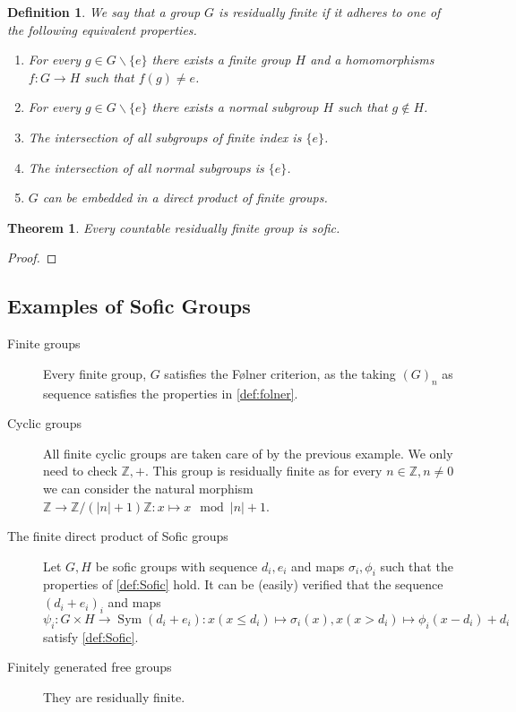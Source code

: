 \documentclass[titlepage, a4paper]{article}
\newcommand{\Z}{\mathbb{Z}}
\DeclareMathOperator{\sym}{Sym}
\newtheorem{theorem}{Theorem}
\newtheorem{definition}{Definition}
\theoremstyle{remark}
\begin{document}
\begin{definition}\cite{noauthor_residually_2018} \label{def:res_fin}
       We say that a group $G$ is residually finite if it adheres to one of the following equivalent properties.
        \begin{enumerate}
            \item For every $g \in G\backslash\{e\}$ there exists a finite group $H$ and a homomorphisms $f:G \to H$ such that $f(g) \ne e$.
            \item For every $g \in G\backslash\{e\}$ there exists a normal subgroup $H$ such that $g \notin H$.
            \item The intersection of all subgroups of finite index is $\{e\}$.
            \item The intersection of all normal subgroups is $\{e\}$.
            \item $G$ can be embedded in a direct product of finite groups.
        \end{enumerate}
    \end{definition}





    \begin{theorem} \label{thm:res_fin_sofic}
        Every countable residually finite group is sofic.
    \end{theorem}
    \begin{proof}
        
    \end{proof}

    \subsection{Examples of Sofic Groups}
    \begin{description}
        \item[Finite groups] Every finite group, $G$ satisfies the Følner criterion, as the taking $(G)_n$ as sequence satisfies the properties in \cref{def:folner}.
        \item[Cyclic groups] All finite cyclic groups are taken care of by the previous example. We only need to check $\Z,+$. This group is residually finite as for every $n \in \Z, n \ne 0$ we can consider the natural morphism $\Z \to \Z /(|n|+1)\Z: x \mapsto x \mod |n|+1$. 
        \item[The finite direct product of Sofic groups] Let $G, H$ be sofic groups with sequence $d_i, e_i$ and maps $\sigma_i, \phi_i$ such that the properties of \cref{def:Sofic} hold. It can be (easily) verified that the sequence $(d_i + e_i)_i$ and maps $\psi_i: G \times H \to \sym(d_i + e_i): x (x \le d_i) \mapsto \sigma_i(x), x (x > d_i) \mapsto \phi_i(x -d_i) + d_i$ satisfy \cref{def:Sofic}.
        \item[Finitely generated free groups] They are residually finite.
    \end{description}
\end{document}
